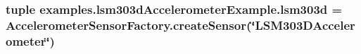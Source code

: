 \subsubsection[{lsm303d}]{\setlength{\rightskip}{0pt plus 5cm}tuple examples.\+lsm303d\+Accelerometer\+Example.\+lsm303d = {\bf Accelerometer\+Sensor\+Factory.\+create\+Sensor}(\char`\"{}L\+S\+M303\+D\+Accelerometer\char`\"{})}\label{namespaceexamples_1_1lsm303dAccelerometerExample_a417e4f0eb916b4176b0174046c76a1bf}
